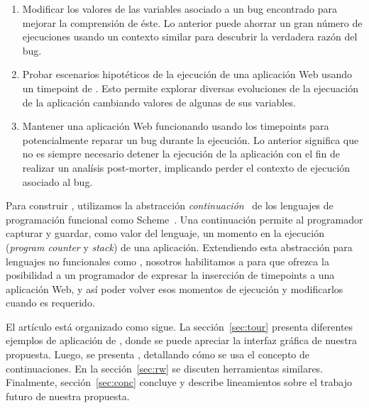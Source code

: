 \documentclass[conference]{IEEEtran}
\begin{document}
\begin{enumerate}
	
	\item Modificar los valores de las variables asociado a un bug encontrado para mejorar la comprensi\'on de \'este. Lo anterior puede ahorrar un gran n\'umero de ejecuciones usando un contexto similar para descubrir la verdadera raz\'on del bug.

	\smallskip

	\item Probar escenarios hipot\'eticos de la ejecuci\'on de una aplicaci\'on Web usando un timepoint de \deloreanjs. Esto permite explorar diversas evoluciones de la ejecuaci\'on de la aplicaci\'on cambiando valores de algunas de sus variables.
   
   \smallskip
	 
	\item Mantener una aplicaci\'on Web funcionando usando los timepoints para potencialmente reparar un bug durante la ejecuci\'on. Lo anterior significa que no es siempre necesario detener la ejecuci\'on de la aplicaci\'on con el fin de realizar un anal\'isis post-morter, implicando perder el contexto de ejecuci\'on asociado al bug.  

\end{enumerate}


Para construir \deloreanjs, utilizamos la abstracci\'on {\em continuaci\'on}~\cite{fw84} de los lenguajes de programaci\'on funcional como Scheme~\cite{scheme48}. Una continuaci\'on permite al programador capturar y guardar, como valor del lenguaje, un momento en la ejecuci\'on ({\em program counter} y {\em stack}) de una aplicaci\'on. Extendiendo esta abstracci\'on para lenguajes no funcionales como \javascript, nosotros habilitamos a \deloreanjs para que ofrezca la posibilidad a un programador de expresar la insercci\'on de timepoints a una aplicaci\'on Web,  y as\'i poder volver esos momentos de ejecuci\'on y modificarlos cuando es requerido.   


El art\'iculo est\'a organizado como sigue. La secci\'on~\ref{sec:tour} presenta diferentes ejemplos de aplicaci\'on de \deloreanjs, donde se puede apreciar la interfaz gr\'afica de nuestra propuesta. Luego, se presenta \deloreanjs, detallando c\'omo se usa el concepto de continuaciones. En la secci\'on~\ref{sec:rw} se discuten herramientas similares. Finalmente, secci\'on~\ref{sec:conc} concluye y describe lineamientos sobre el trabajo futuro de nuestra propuesta.      

\smallskip
\end{document}
